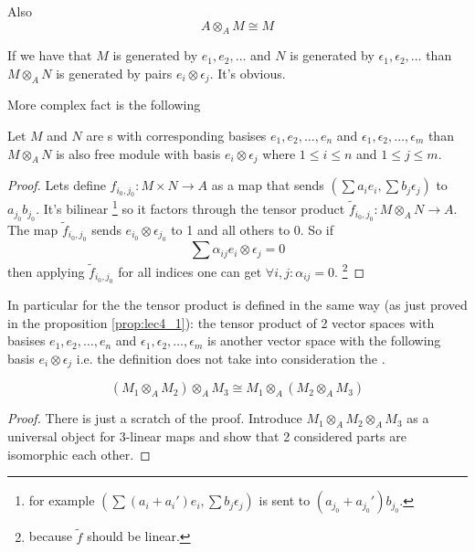 Also
\[
A \otimes_A M \cong M
\]

If we have that $M$ is generated by $e_1, e_2, \dots$ and
$N$ is generated by $\epsilon_1, \epsilon_2, \dots$ than
$M \otimes_A N$ is generated by pairs $e_i \otimes \epsilon_j$. It's
obvious.

More complex fact is the following
\begin{proposition}
  Let $M$ and $N$ are s
  with corresponding basises $e_1, e_2, \dots, e_n$ and
  $\epsilon_1, \epsilon_2, \dots, \epsilon_m$ than
  $M \otimes_A N$ is also free module with basis $e_i \otimes
  \epsilon_j$ where $1 \le i \le n$ and
  $1 \le j \le m$.
  \begin{proof}
    Lets define
    $f_{i_0,j_0}: M \times N \to A$ as a map that sends
    $\left(\sum a_i e_i, \sum b_j \epsilon_j\right)$ to
    $a_{j_0} b_{j_0}$. It's bilinear
    \footnote{
      for example
      $\left(\sum (a_i + a_i') e_i, \sum b_j \epsilon_j\right)$ is
      sent to  $(a_{j_0} + a_{j_0}') b_{j_0}$.
    }
    so it factors through the tensor product
    $\tilde{f}_{i_0, j_0} : M \otimes_A N \to A$. The map
    $\tilde{f}_{i_0, j_0}$ sends $e_{i_0} \otimes \epsilon_{j_0}$ to 1
    and all others to 0. So if
    \[
    \sum \alpha_{ij} e_i \otimes \epsilon_j = 0
    \]
    then applying $\tilde{f}_{i_0, j_0}$ for all indices one can get
    $\forall i,j: \alpha_{ij} = 0$.
    \footnote{
      because $\tilde{f}$ should be linear.
    }
  \end{proof}
  \label{prop:lec4_1}
\end{proposition}

In particular for the  the tensor product is
defined in the same way (as just proved in the proposition
\ref{prop:lec4_1}): the tensor product of 2 vector spaces with
basises $e_1, e_2, \dots, e_n$ and
$\epsilon_1, \epsilon_2, \dots, \epsilon_m$ is another vector space
with the following basis $e_i \otimes \epsilon_j$ i.e. the definition
does not take into consideration the .

\begin{proposition}[Associative]
  \[
  \left(M_1 \otimes_A M_2\right) \otimes_A M_3
  \cong
  M_1 \otimes_A \left(M_2 \otimes_A M_3\right)
  \]
  \begin{proof}
    There is just a scratch of the proof.
    Introduce
    $M_1 \otimes_A M_2 \otimes_A M_3$
    as a universal object for 3-linear maps and show that 2 considered
    parts are isomorphic each other.
  \end{proof}
  \label{prop:lec4_Associative}
\end{proposition}

